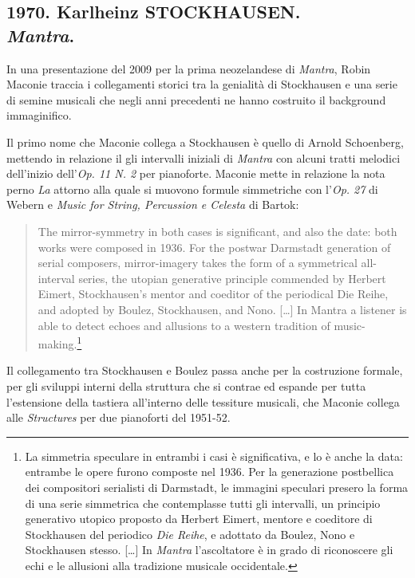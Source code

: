 
\subsection*{1970. Karlheinz STOCKHAUSEN.\\\emph{Mantra}.}

In una presentazione del 2009 per la prima neozelandese di \emph{Mantra}, Robin Maconie traccia i collegamenti storici tra la genialità di Stockhausen e una serie di semine musicali che negli anni precedenti ne hanno costruito il background immaginifico.

Il primo nome che Maconie collega a Stockhausen è quello di Arnold Schoenberg, mettendo in relazione il gli intervalli iniziali di \emph{Mantra} con alcuni tratti melodici dell'inizio dell'\emph{Op. 11 N. 2} per pianoforte. Maconie mette in relazione la nota perno \emph{La} attorno alla quale si muovono formule simmetriche con l'\emph{Op. 27} di Webern e \emph{Music for String, Percussion e Celesta} di Bartok:

\begin{quote} The mirror-symmetry in both cases is significant, and also the date: both works were composed in 1936. For the postwar Darmstadt generation of serial composers, mirror-imagery takes the form of a symmetrical all-interval series, the utopian generative principle commended by Herbert Eimert, Stockhausen's mentor and coeditor of the periodical Die Reihe, and adopted by Boulez, Stockhausen, and Nono. [\ldots] In Mantra a listener is able to detect echoes and allusions to a western tradition of music-making.\footnote{La simmetria speculare in entrambi i casi è significativa, e lo è anche la data: entrambe le opere furono composte nel 1936. Per la generazione postbellica dei compositori serialisti di Darmstadt, le immagini speculari presero la forma di una serie simmetrica che contemplasse tutti gli intervalli, un principio generativo utopico proposto da Herbert Eimert, mentore e coeditore di Stockhausen del periodico \emph{Die Reihe}, e adottato da Boulez, Nono e Stockhausen stesso. [\ldots] In \emph{Mantra} l'ascoltatore è in grado di riconoscere gli echi e le allusioni alla tradizione musicale occidentale.}
\end{quote}

Il collegamento tra Stockhausen e Boulez passa anche per la costruzione formale, per gli sviluppi interni della struttura che si contrae ed espande per tutta l'estensione della tastiera all'interno delle tessiture musicali, che Maconie collega alle \emph{Structures} per due pianoforti del 1951-52.

